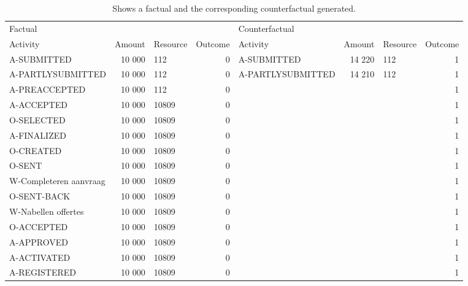 \begin{table}
\caption{Shows a factual and the corresponding counterfactual generated.}
\label{tbl:example-cf}
\begin{tabular}{lrlrlrlr}
\toprule
\multicolumn{4}{l}{Factual} & \multicolumn{4}{l}{Counterfactual} \\
Activity & Amount & Resource & Outcome & Activity & Amount & Resource & Outcome \\
\midrule
A-SUBMITTED & 10 000 & 112 & 0 & A-SUBMITTED & 14 220 & 112 & 1 \\
A-PARTLYSUBMITTED & 10 000 & 112 & 0 & A-PARTLYSUBMITTED & 14 210 & 112 & 1 \\
A-PREACCEPTED & 10 000 & 112 & 0 &  &  &  & 1 \\
A-ACCEPTED & 10 000 & 10809 & 0 &  &  &  & 1 \\
O-SELECTED & 10 000 & 10809 & 0 &  &  &  & 1 \\
A-FINALIZED & 10 000 & 10809 & 0 &  &  &  & 1 \\
O-CREATED & 10 000 & 10809 & 0 &  &  &  & 1 \\
O-SENT & 10 000 & 10809 & 0 &  &  &  & 1 \\
W-Completeren aanvraag & 10 000 & 10809 & 0 &  &  &  & 1 \\
O-SENT-BACK & 10 000 & 10809 & 0 &  &  &  & 1 \\
W-Nabellen offertes & 10 000 & 10809 & 0 &  &  &  & 1 \\
O-ACCEPTED & 10 000 & 10809 & 0 &  &  &  & 1 \\
A-APPROVED & 10 000 & 10809 & 0 &  &  &  & 1 \\
A-ACTIVATED & 10 000 & 10809 & 0 &  &  &  & 1 \\
A-REGISTERED & 10 000 & 10809 & 0 &  &  &  & 1 \\
\bottomrule
\end{tabular}
\end{table}

